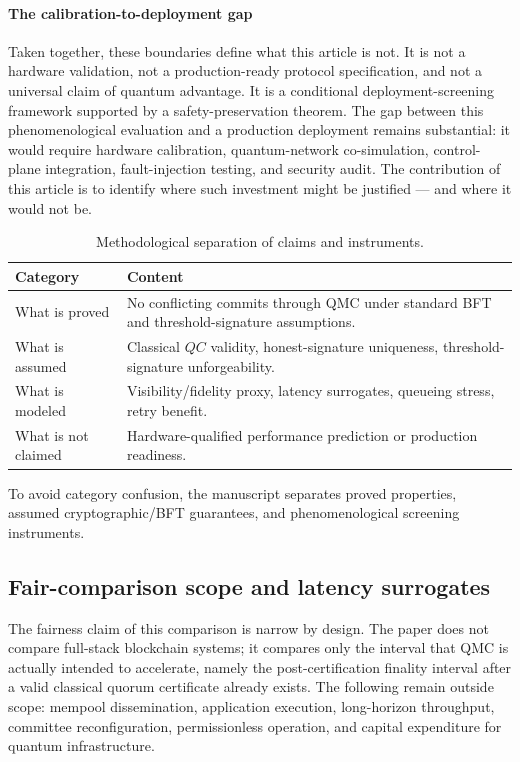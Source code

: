 \documentclass{ieeeaccess}
\begin{document}
\paragraph{The calibration-to-deployment gap}
Taken together, these boundaries define what this article is not. It is not a hardware validation, not a production-ready protocol specification, and not a universal claim of quantum advantage. It is a conditional deployment-screening framework supported by a safety-preservation theorem. The gap between this phenomenological evaluation and a production deployment remains substantial: it would require hardware calibration, quantum-network co-simulation, control-plane integration, fault-injection testing, and security audit. The contribution of this article is to identify where such investment might be justified --- and where it would not be.


\begin{table}[!t]
\caption{Methodological separation of claims and instruments.}
\label{tab:claimmap}
\centering
\scriptsize
\setlength{\tabcolsep}{4pt}
\renewcommand{\arraystretch}{1.15}
\begin{tabularx}{\columnwidth}{@{}p{2.25cm}X@{}}
\toprule
\textbf{Category} & \textbf{Content} \\
\midrule
What is proved & No conflicting commits through QMC under standard BFT and threshold-signature assumptions. \\
What is assumed & Classical $QC$ validity, honest-signature uniqueness, threshold-signature unforgeability. \\
What is modeled & Visibility/fidelity proxy, latency surrogates, queueing stress, retry benefit. \\
What is not claimed & Hardware-qualified performance prediction or production readiness. \\
\bottomrule
\end{tabularx}
\end{table}

To avoid category confusion, the manuscript separates proved properties, assumed cryptographic/BFT guarantees, and phenomenological screening instruments.

\subsection{Fair-comparison scope and latency surrogates}
The fairness claim of this comparison is narrow by design. The paper does not compare full-stack blockchain systems; it compares only the interval that QMC is actually intended to accelerate, namely the post-certification finality interval after a valid classical quorum certificate already exists. The following remain outside scope: mempool dissemination, application execution, long-horizon throughput, committee reconfiguration, permissionless operation, and capital expenditure for quantum infrastructure.
\end{document}
